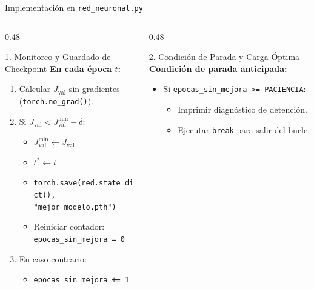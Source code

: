 \documentclass[10pt,aspectratio=169]{beamer}
\begin{document}
\begin{frame}{Implementación en \texttt{red\_neuronal.py}}
  \begin{columns}[T]
    \begin{column}{0.48\textwidth}
      \begin{block}{1. Monitoreo y Guardado de Checkpoint}
        \scriptsize
\textbf{En cada época $t$:}
\begin{enumerate}
  \item Calcular $J_{\text{val}}$ sin gradientes (\texttt{torch.no\_grad()}).
  \item Si $J_{\text{val}} < J_{\text{val}}^{\min} - \delta$:
  \begin{itemize}\scriptsize
    \item $J_{\text{val}}^{\min} \leftarrow J_{\text{val}}$
    \item $t^* \leftarrow t$
    \item \texttt{torch.save(red.state\_dict(), "mejor\_modelo.pth")}
    \item Reiniciar contador: \texttt{epocas\_sin\_mejora = 0}
  \end{itemize}
  \item En caso contrario:
  \begin{itemize}\scriptsize
    \item \texttt{epocas\_sin\_mejora += 1}
  \end{itemize}
\end{enumerate}
      \end{block}
    \end{column}

    \begin{column}{0.48\textwidth}
      \begin{block}{2. Condición de Parada y Carga Óptima}
        \scriptsize
\textbf{Condición de parada anticipada:}
\begin{itemize}
  \item Si \texttt{epocas\_sin\_mejora >= PACIENCIA}:
  \begin{itemize}\scriptsize
    \item Imprimir diagnóstico de detención.
    \item Ejecutar \texttt{break} para salir del bucle.
  \end{itemize}
\end{itemize}


\end{block}
\end{column}
\end{columns}
\end{frame}
\end{document}
